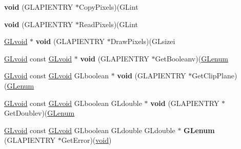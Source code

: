 \begin{DoxyCompactItemize}
\item 
\mbox{\label{struct_____g_ldispatch_table_rec_adef82430c8be2457ee28679eb6b0545d}} 
{\bfseries void} (G\+L\+A\+P\+I\+E\+N\+T\+RY $\ast$Copy\+Pixels)(G\+Lint
\item 
\mbox{\label{struct_____g_ldispatch_table_rec_abcf421ac2e0d049058209789c67c43e4}} 
{\bfseries void} (G\+L\+A\+P\+I\+E\+N\+T\+RY $\ast$Read\+Pixels)(G\+Lint
\item 
\mbox{\label{struct_____g_ldispatch_table_rec_a4fbd6bceb7a122c9de127d46750446b9}} 
\hyperlink{interfacevoid}{G\+Lvoid} $\ast$ {\bfseries void} (G\+L\+A\+P\+I\+E\+N\+T\+RY $\ast$Draw\+Pixels)(G\+Lsizei
\item 
\mbox{\label{struct_____g_ldispatch_table_rec_a52adde5b5b52f168ace8d6508facaa61}} 
\hyperlink{interfacevoid}{G\+Lvoid} const \hyperlink{interfacevoid}{G\+Lvoid} $\ast$ {\bfseries void} (G\+L\+A\+P\+I\+E\+N\+T\+RY $\ast$Get\+Booleanv)(\hyperlink{interfacevoid}{G\+Lenum}
\item 
\mbox{\label{struct_____g_ldispatch_table_rec_a1c76e64f36c4f62b4d30c8fe1bf47960}} 
\hyperlink{interfacevoid}{G\+Lvoid} const \hyperlink{interfacevoid}{G\+Lvoid} G\+Lboolean $\ast$ {\bfseries void} (G\+L\+A\+P\+I\+E\+N\+T\+RY $\ast$Get\+Clip\+Plane)(\hyperlink{interfacevoid}{G\+Lenum}
\item 
\mbox{\label{struct_____g_ldispatch_table_rec_a500c041f13d17a162a5daa93173fdc7d}} 
\hyperlink{interfacevoid}{G\+Lvoid} const \hyperlink{interfacevoid}{G\+Lvoid} G\+Lboolean G\+Ldouble $\ast$ {\bfseries void} (G\+L\+A\+P\+I\+E\+N\+T\+RY $\ast$Get\+Doublev)(\hyperlink{interfacevoid}{G\+Lenum}
\item 
\mbox{\label{struct_____g_ldispatch_table_rec_a09a04d8ef55d1cbc60ccbfcde0cf70a9}} 
\hyperlink{interfacevoid}{G\+Lvoid} const \hyperlink{interfacevoid}{G\+Lvoid} G\+Lboolean G\+Ldouble G\+Ldouble $\ast$ {\bfseries G\+Lenum} (G\+L\+A\+P\+I\+E\+N\+T\+RY $\ast$Get\+Error)(\hyperlink{interfacevoid}{void})
\item 
\mbox{\label{struct_____g_ldispatch_table_rec_add572f02208d174e3cc68831eaaffe1f}} 

\end{DoxyCompactItemize}
